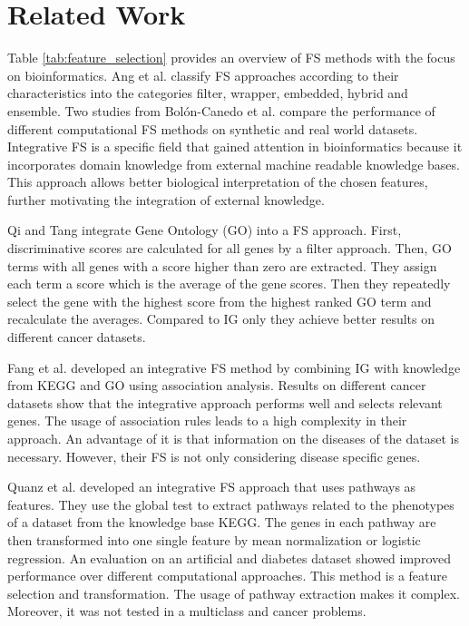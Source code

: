 \chapter{Related Work}
\label{chapter:relatedWork}

Table \ref{tab:feature_selection} provides an overview of FS methods with the focus on bioinformatics.
Ang et al. classify FS approaches according to their characteristics into the categories filter, wrapper, embedded, hybrid and ensemble\cite{ang2016supervised}.
Two studies from Bol\'{o}n-Canedo et al. compare the performance of different computational FS methods on synthetic and real world datasets\cite{bolon2014review}\cite{bolon2013review}.
Integrative FS is a specific field that gained attention in bioinformatics because it incorporates domain knowledge from external machine readable knowledge bases\cite{bellazzi2007towards}.
This approach allows better biological interpretation of the chosen features, further motivating the integration of external knowledge\cite{fang2014integrative}.

Qi and Tang integrate Gene Ontology (GO) into a FS approach\cite{qi2007integrating}.
First, discriminative scores are calculated for all genes by a filter approach.
Then, GO terms with all genes with a score higher than zero are extracted.
They assign each term a score which is the average of the gene scores.
Then they repeatedly select the gene with the highest score from the highest ranked GO term and recalculate the averages.
Compared to IG only they achieve better results on different cancer datasets.

Fang et al. developed an integrative FS method by combining IG with knowledge from KEGG and GO using association analysis\cite{fang2014integrative}.
Results on different cancer datasets show that the integrative approach performs well and selects relevant genes.
The usage of association rules leads to a high complexity in their approach.
An advantage of it is that information on the diseases of the dataset is necessary.
However, their FS is not only considering disease specific genes.

Quanz et al. developed an integrative FS approach that uses pathways as features\cite{quanz2008biological}. 
They use the global test to extract pathways related to the phenotypes of a dataset from the knowledge base KEGG\cite{kanehisa2000kegg}. 
The genes in each pathway are then transformed into one single feature by mean normalization or logistic regression.
An evaluation on an artificial and diabetes dataset showed improved performance over different computational approaches.
This method is a feature selection and transformation.
The usage of pathway extraction makes it complex.
Moreover, it was not tested in a multiclass and cancer problems.

